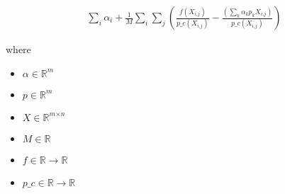 \documentclass[12pt]{article}
\begin{document}
\begin{align*}
\sum_\textit{i} \textit{α}_{ \textit{i} } + \frac{1}{\textit{M}}\sum_\textit{i} \sum_\textit{j} \left( \frac{\textit{f}\left( \textit{X}_{\textit{i}, \textit{j}} \right)}{\textit{p\_c}\left( \textit{X}_{\textit{i}, \textit{j}} \right)} - \frac{\left( \sum_\textit{k} \textit{α}_{ \textit{k} }\textit{p}_{ \textit{k} }\textit{X}_{\textit{i}, \textit{j}} \right)}{\textit{p\_c}\left( \textit{X}_{\textit{i}, \textit{j}} \right)} \right)
\end{align*}

where
\begin{itemize}
\item $\textit{α} \in \mathbb{R}^{ \textit{m}}$
\item $\textit{p} \in \mathbb{R}^{ \textit{m}}$
\item $\textit{X} \in \mathbb{R}^{ \textit{m} \times \textit{n} }$
\item $\textit{M} \in \mathbb{{R}}$
\item $\textit{f} \in \mathbb{{R}}\rightarrow \mathbb{{R}}$
\item $\textit{p\_c} \in \mathbb{{R}}\rightarrow \mathbb{{R}}$
\end{itemize}
\end{document}
